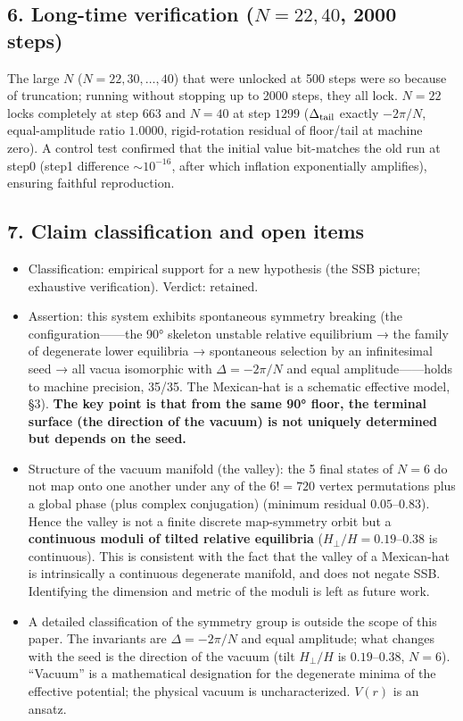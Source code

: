 \documentclass[
  a4paper,
]{ltjsarticle}
\providecommand{\tightlist}{%
  \setlength{\itemsep}{0pt}\setlength{\parskip}{0pt}}
\begin{document}
\subsection{\texorpdfstring{6. Long-time verification (\(N=22,40\), 2000
steps)}{6. Long-time verification (N=22,40, 2000 steps)}}\label{long-time-verification-n2240-2000-steps}

The large \(N\) (\(N=22,30,\ldots,40\)) that were unlocked at 500 steps
were so because of truncation; running without stopping up to 2000
steps, they all lock. \(N=22\) locks completely at step \(663\) and
\(N=40\) at step \(1299\) (\(\Delta_{\rm tail}\) exactly \(-2\pi/N\),
equal-amplitude ratio \(1.0000\), rigid-rotation residual of floor/tail
at machine zero). A control test confirmed that the initial value
bit-matches the old run at step0 (step1 difference \(\sim10^{-16}\),
after which inflation exponentially amplifies), ensuring faithful
reproduction.

\subsection{7. Claim classification and open
items}\label{claim-classification-and-open-items}

\begin{itemize}
\tightlist
\item
  Classification: empirical support for a new hypothesis (the SSB
  picture; exhaustive verification). Verdict: retained.
\item
  Assertion: this system exhibits spontaneous symmetry breaking (the
  configuration------the 90° skeleton unstable relative equilibrium →
  the family of degenerate lower equilibria → spontaneous selection by
  an infinitesimal seed → all vacua isomorphic with \(\Delta=-2\pi/N\)
  and equal amplitude------holds to machine precision, 35/35. The
  Mexican-hat is a schematic effective model, §3). \textbf{The key point
  is that from the same 90° floor, the terminal surface (the direction
  of the vacuum) is not uniquely determined but depends on the seed.}
\item
  Structure of the vacuum manifold (the valley): the 5 final states of
  \(N=6\) do not map onto one another under any of the \(6!=720\) vertex
  permutations plus a global phase (plus complex conjugation) (minimum
  residual \(0.05\)--\(0.83\)). Hence the valley is not a finite
  discrete map-symmetry orbit but a \textbf{continuous moduli of tilted
  relative equilibria} (\(H_\perp/H=0.19\)--\(0.38\) is continuous).
  This is consistent with the fact that the valley of a Mexican-hat is
  intrinsically a continuous degenerate manifold, and does not negate
  SSB. Identifying the dimension and metric of the moduli is left as
  future work.
\item
  A detailed classification of the symmetry group is outside the scope
  of this paper. The invariants are \(\Delta=-2\pi/N\) and equal
  amplitude; what changes with the seed is the direction of the vacuum
  (tilt \(H_\perp/H\) is \(0.19\)--\(0.38\), \(N=6\)). ``Vacuum'' is a
  mathematical designation for the degenerate minima of the effective
  potential; the physical vacuum is uncharacterized. \(V(r)\) is an
  ansatz.
\end{itemize}
\end{document}
